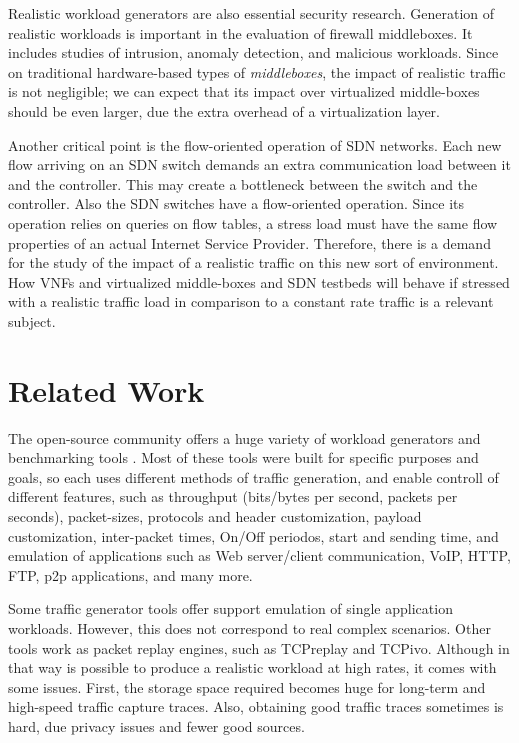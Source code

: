 Realistic workload generators are also essential security research\cite{ditg-paper}.  Generation of realistic workloads is important in the evaluation of firewall middleboxes. It includes studies of intrusion, anomaly detection, and malicious workloads\cite{ditg-paper}. Since on traditional hardware-based types of \textit{middleboxes}, the impact of realistic traffic is not negligible; we can expect that its impact over virtualized middle-boxes should be even larger, due the extra overhead of a virtualization layer. 


Another critical point is the flow-oriented operation of SDN networks. Each new flow arriving on an SDN switch demands an extra communication load between it and the controller. This may create a bottleneck between the switch and the controller.  Also the SDN switches have a flow-oriented operation. Since its operation relies on queries on flow tables, a stress load must have the same flow properties of an actual Internet Service Provider. Therefore, there is a demand for the study of the impact of a realistic traffic on this new sort of environment. How VNFs and virtualized middle-boxes and SDN testbeds will behave if stressed with a realistic traffic load in comparison to a constant rate traffic is a relevant subject. 


\section{Related Work}


The open-source community offers a huge variety of workload generators and benchmarking tools \cite{ditg-paper}\cite{validate-trafficgen}\cite{comparative-trafficgen-tools}\cite{performance-trafficgen}. Most of these tools were built for specific purposes and goals, so each uses different methods of traffic generation, and enable controll of different features, such as throughput (bits/bytes per second, packets per seconds), packet-sizes, protocols and header customization, payload customization, inter-packet times, On/Off periodos, start and sending time, and emulation of applications such as Web server/client communication, VoIP, HTTP, FTP, p2p applications, and many more.


Some traffic generator tools offer support emulation of single application workloads. However, this does not correspond to real complex scenarios. Other tools work as packet replay engines, such as TCPreplay and TCPivo. Although in that way is possible to produce a realistic workload at high rates, it comes with some issues. First, the storage space required becomes huge for long-term and high-speed traffic capture traces. Also, obtaining good traffic traces sometimes is hard, due privacy issues and fewer good sources. 


